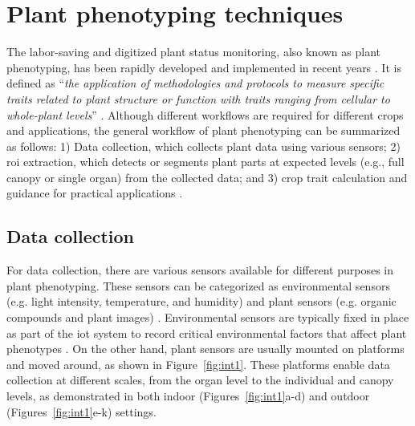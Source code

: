 \section{Plant phenotyping techniques}
The labor-saving and digitized plant status monitoring, also known as plant phenotyping, has been rapidly developed and implemented in recent years \citep{araus_field_2014}. It is defined as ``\textit{the application of methodologies and protocols to measure specific traits related to plant structure or function with traits ranging from cellular to whole-plant levels}'' \citep{fiorani_future_2013, ghanem_physiological_2015}. Although different workflows are required for different crops and applications, the general workflow of plant phenotyping can be summarized as follows: 1) Data collection, which collects plant data using various sensors; 2) \gls{roi} extraction, which detects or segments plant parts at expected levels (e.g., full canopy or single organ) from the collected data; and 3) crop trait calculation and guidance for practical applications \citep{zhao_crop_2019}.

\subsection{Data collection}
For data collection, there are various sensors available for different purposes in plant phenotyping. These sensors can be categorized as environmental sensors (e.g. light intensity, temperature, and humidity) and plant sensors (e.g. organic compounds and plant images) \citep{garlando_plants_2020}. Environmental sensors are typically fixed in place as part of the \gls{iot} system to record critical environmental factors that affect plant phenotypes \citep{ghanem_physiological_2015}. On the other hand, plant sensors are usually mounted on platforms and moved around, as shown in Figure~\ref{fig:int1}. These platforms enable data collection at different scales, from the organ level to the individual and canopy levels, as demonstrated in both indoor (Figures~\ref{fig:int1}a-d) and outdoor (Figures~\ref{fig:int1}e-k) settings.




